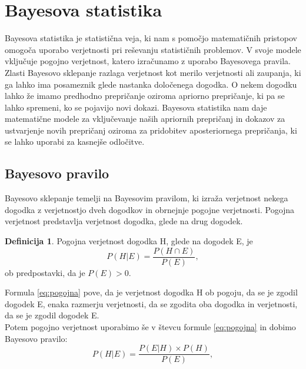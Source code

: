 \documentclass[12pt,a4paper]{amsart}
\theoremstyle{definition} %
\newtheorem{definicija}{Definicija}[section]
\theoremstyle{plain} %
\begin{document}
\section{Bayesova statistika}
Bayesova statistika je statistična veja, ki nam s pomočjo matematičnih pristopov omogoča uporabo verjetnosti pri reševanju statističnih 
problemov. V svoje modele vključuje pogojno verjetnost, katero izračunamo z uporabo Bayesovega pravila. \\

Zlasti Bayesovo sklepanje razlaga verjetnost kot merilo verjetnosti ali zaupanja, ki ga lahko ima posameznik glede nastanka določenega dogodka. 
O nekem dogodku lahko že imamo predhodno prepričanje oziroma apriorno prepričanje, ki pa se lahko spremeni, ko se pojavijo novi dokazi. Bayesova 
statistika nam daje matematične modele za vključevanje naših apriornih prepričanj in dokazov za ustvarjenje novih prepričanj oziroma za 
pridobitev aposteriornega prepričanja, ki se lahko uporabi za kasnejše odločitve.

\subsection{Bayesovo pravilo} 
Bayesovo sklepanje temelji na Bayesovim pravilom, ki izraža verjetnost nekega dogodka z verjetnostjo dveh dogodkov in obrnejnje pogojne 
verjetnosti. Pogojna verjetnost predstavlja verjetnost dogodka, glede na drug dogodek. 

\begin{definicija}
Pogojna verjetnost dogodka H, glede na dogodek E, je
\begin{equation}\label{eq:pogojna}
P(H \lvert E) = \frac{P(H \cap E)}{P(E)},
\end{equation}
ob predpostavki, da je $P(E) > 0$.
\end{definicija}

Formula \eqref{eq:pogojna} pove, da je verjetnost dogodka H ob pogoju, da se je zgodil dogodek E, enaka razmerju verjetnosti, da se 
zgodita oba dogodka in verjetnosti, da se je zgodil dogodek E.\\

Potem pogojno verjetnost uporabimo še v števcu formule \eqref{eq:pogojna} in dobimo Bayesovo pravilo:
\begin{equation}\label{eq:bpravilo}
    P(H \lvert E) = \frac{P(E \lvert H) \times P(H)}{P(E)},
\end{equation}
\end{document}
